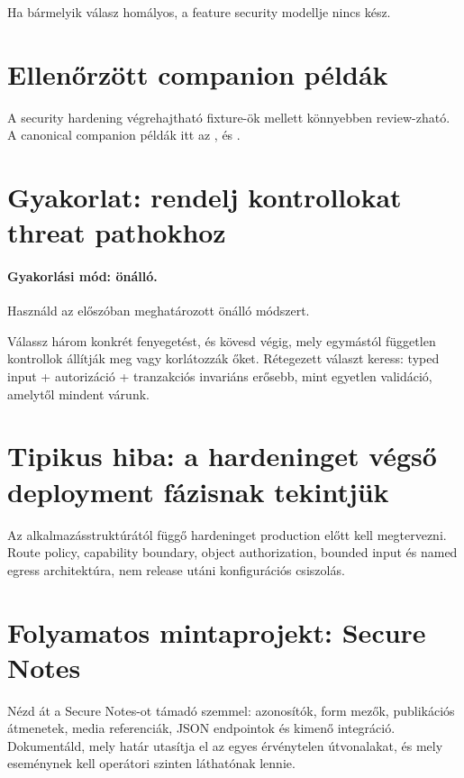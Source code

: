 Ha bármelyik válasz homályos, a feature security modellje nincs kész.

\section{Ellenőrzött companion példák}
A security hardening végrehajtható fixture-ök mellett könnyebben review-zható. A canonical companion példák itt az ,  és .

\section{Gyakorlat: rendelj kontrollokat threat pathokhoz}
\paragraph{Gyakorlási mód: önálló.} Használd az előszóban meghatározott önálló módszert.

Válassz három konkrét fenyegetést, és kövesd végig, mely egymástól független kontrollok állítják meg vagy korlátozzák őket. Rétegezett választ keress: typed input + autorizáció + tranzakciós invariáns erősebb, mint egyetlen validáció, amelytől mindent várunk.

\section{Tipikus hiba: a hardeninget végső deployment fázisnak tekintjük}
Az alkalmazásstruktúrától függő hardeninget production előtt kell megtervezni. Route policy, capability boundary, object authorization, bounded input és named egress architektúra, nem release utáni konfigurációs csiszolás.

\section{Folyamatos mintaprojekt: Secure Notes}
Nézd át a Secure Notes-ot támadó szemmel: azonosítók, form mezők, publikációs átmenetek, media referenciák, JSON endpointok és kimenő integráció. Dokumentáld, mely határ utasítja el az egyes érvénytelen útvonalakat, és mely eseménynek kell operátori szinten láthatónak lennie.
